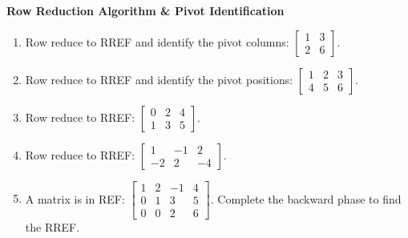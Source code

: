 \documentclass[11pt]{article}
\begin{document}
\textbf{Row Reduction Algorithm \& Pivot Identification}
\begin{enumerate}[label=\textbf{1.2.\arabic*}, resume]
    \item Row reduce to RREF and identify the pivot columns: $\left[\begin{array}{cc} 1 & 3 \\ 2 & 6 \end{array}\right]$.
    \item Row reduce to RREF and identify the pivot positions: $\left[\begin{array}{ccc} 1 & 2 & 3 \\ 4 & 5 & 6 \end{array}\right]$.
    \item Row reduce to RREF: $\left[\begin{array}{ccc} 0 & 2 & 4 \\ 1 & 3 & 5 \end{array}\right]$.
    \item Row reduce to RREF: $\left[\begin{array}{ccc} 1 & -1 & 2 \\ -2 & 2 & -4 \end{array}\right]$.
    \item A matrix is in REF: $\left[\begin{array}{ccc|c} 1 & 2 & -1 & 4 \\ 0 & 1 & 3 & 5 \\ 0 & 0 & 2 & 6 \end{array}\right]$. Complete the backward phase to find the RREF.
\end{enumerate}
\end{document}

